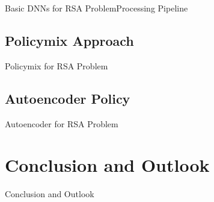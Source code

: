 \documentclass[english,american,german,aspectratio=169]{beamer}
\begin{document}
\begin{frame}{Basic DNNs for RSA Problem}{Processing Pipeline}
	
\end{frame}


\subsection{Policymix Approach}

\begin{frame}{Policymix for RSA Problem}{}
	
\end{frame}


\subsection{Autoencoder Policy}

\begin{frame}{Autoencoder for RSA Problem}{}
	 
\end{frame}



\section{Conclusion and Outlook}

\begin{frame}{Conclusion and Outlook}{}
	 
\end{frame}
\end{document}
